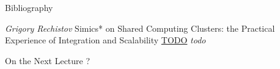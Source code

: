 \begin{frame}[allowframebreaks]{Bibliography}
\begin{thebibliography}{99}
   \textit{Grigory Rechistov} Simics* on Shared Computing Clusters: the Practical Experience of Integration and Scalability \url{TODO}
   \textit{todo}

\end{thebibliography}
\end{frame}

\begin{frame}{On the Next Lecture}
?
\end{frame}

\finalslide



